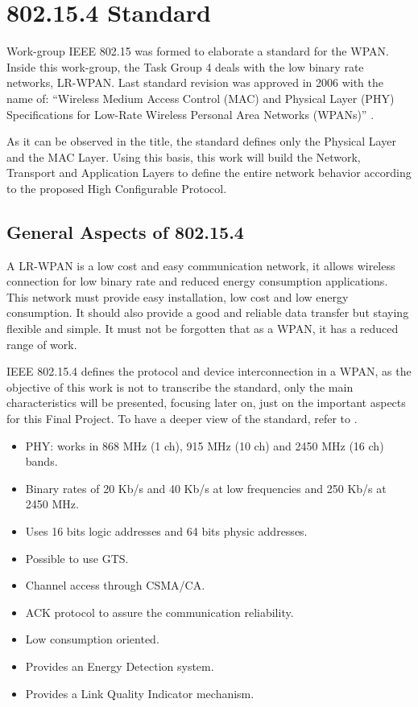\chapter{802.15.4 Standard}
\label{chap:802154standard}

Work-group \ac{IEEE} 802.15 was formed to elaborate a standard for the \ac{WPAN}. Inside this work-group, the Task Group 4 
deals with the low binary rate networks, \ac{LR-WPAN}. Last standard revision was approved in 2006 with the name of: ``Wireless 
Medium Access Control (\ac{MAC}) and Physical Layer (\ac{PHY}) Specifications for Low-Rate Wireless Personal Area Networks (\acp{WPAN})'' 
\cite{IEEE802.15.4-2006}.

As it can be observed in the title, the standard defines only the Physical Layer and the \ac{MAC} Layer. Using this basis, 
this work will build the Network, Transport and Application Layers to define the entire network behavior according to the proposed 
High Configurable Protocol.

\section{General Aspects of 802.15.4}

A \ac{LR-WPAN} is a low cost and easy communication network, it allows wireless connection for low binary rate and reduced 
energy consumption applications. This network must provide easy installation, low cost and low energy consumption. It should
also provide a good and reliable data transfer but staying flexible and simple. It must not be forgotten that as a \ac{WPAN}, it
has a reduced range of work.

\ac{IEEE} 802.15.4 defines the protocol and device interconnection in a \ac{WPAN}, as the objective of this work is not to 
transcribe the standard, only the main characteristics will be presented, focusing later on, just on the important aspects
for this Final Project. To have a deeper view of the standard, refer to \cite{IEEE802.15.4-2006}.

\begin{itemize}
 \item \ac{PHY}: works in 868 MHz (1 ch), 915 MHz (10 ch) and 2450 MHz (16 ch) bands.
 \item Binary rates of 20 Kb/s and 40 Kb/s at low frequencies and 250 Kb/s at 2450 MHz.
 \item Uses 16 bits logic addresses and 64 bits physic addresses.
 \item Possible to use \ac{GTS}.
 \item Channel access through \ac{CSMA/CA}.
 \item \ac{ACK} protocol to assure the communication reliability.
 \item Low consumption oriented.
 \item Provides an Energy Detection system.
 \item Provides a Link Quality Indicator mechanism.
\end{itemize}

